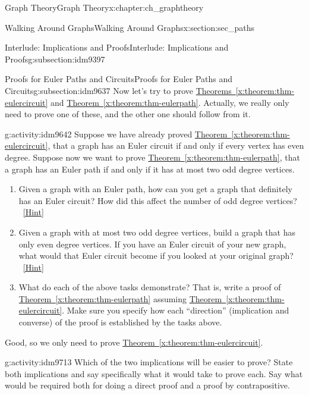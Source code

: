 \documentclass[oneside,10pt,]{book}
\numberwithin{equation}{chapter}
\begin{document}
\begin{chapterptx}{Graph Theory}{}{Graph Theory}{}{}{x:chapter:ch_graphtheory}
\begin{sectionptx}{Walking Around Graphs}{}{Walking Around Graphs}{}{}{x:section:sec_paths}
\begin{subsectionptx}{Interlude: Implications and Proofs}{}{Interlude: Implications and Proofs}{}{}{g:subsection:idm9397}
\end{subsectionptx}
%
%
\typeout{************************************************}
\typeout{************************************************}
%
\begin{subsectionptx}{Proofs for Euler Paths and Circuits}{}{Proofs for Euler Paths and Circuits}{}{}{g:subsection:idm9637}
Now let's try to prove \hyperref[x:theorem:thm-eulercircuit]{Theorems~\ref{x:theorem:thm-eulercircuit}} and \hyperref[x:theorem:thm-eulerpath]{Theorem~\ref{x:theorem:thm-eulerpath}}.  Actually, we really only need to prove one of these, and the other one should follow from it.%
\begin{activity}{}{g:activity:idm9642}%
Suppose we have already proved \hyperref[x:theorem:thm-eulercircuit]{Theorem~\ref{x:theorem:thm-eulercircuit}}, that a graph has an Euler circuit if and only if every vertex has even degree.  Suppose now we want to prove \hyperref[x:theorem:thm-eulerpath]{Theorem~\ref{x:theorem:thm-eulerpath}}, that a graph has an Euler path if and only if it has at most two odd degree vertices.%
\begin{enumerate}[font=\bfseries,label=(\alph*),ref=\alph*]
\item{}Given a graph with an Euler path, how can you get a graph that definitely has an Euler circuit?  How did this affect the number of odd degree vertices?%
\qquad~\hfill{\tiny\hyperlink{g:hint:idm9650-back}{[Hint]}}\item{}Given a graph with at most two odd degree vertices, build a graph that has only even degree vertices.  If you have an Euler circuit of your new graph, what would that Euler circuit become if you looked at your original graph?%
\qquad~\hfill{\tiny\hyperlink{g:hint:idm9674-back}{[Hint]}}\item{}What do each of the above tasks demonstrate?  That is, write a proof of \hyperref[x:theorem:thm-eulerpath]{Theorem~\ref{x:theorem:thm-eulerpath}} assuming \hyperref[x:theorem:thm-eulercircuit]{Theorem~\ref{x:theorem:thm-eulercircuit}}.  Make sure you specify how each ``direction'' (implication and converse) of the proof is established by the tasks above.%
\end{enumerate}
\end{activity}
Good, so we only need to prove \hyperref[x:theorem:thm-eulercircuit]{Theorem~\ref{x:theorem:thm-eulercircuit}}.%
\begin{activity}{}{g:activity:idm9713}%
Which of the two implications will be easier to prove?  State both implications and say specifically what it would take to prove each.  Say what would be required both for doing a direct proof and a proof by contrapositive.%

\end{activity}
\end{subsectionptx}
\end{sectionptx}
\end{chapterptx}
\end{document}
